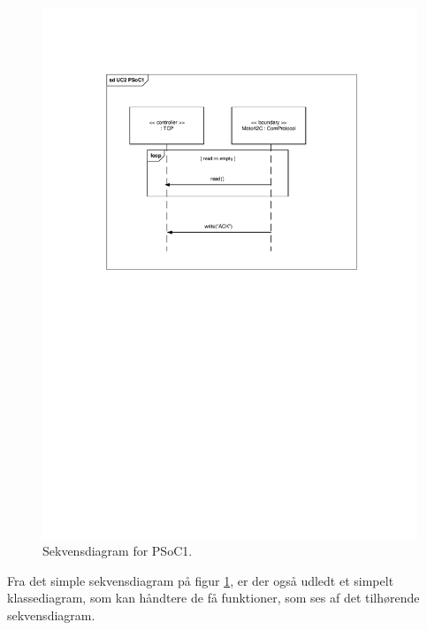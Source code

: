 \begin{figure}[H]
	\centering
	\includegraphics[trim = {3.4cm 15cm 3.2cm 3.7cm}, clip = true, width=\textwidth] {Systemarkitektur/images/SekvensdiagramPSoC1.pdf}
	\caption{Sekvensdiagram for PSoC1.}
	\label{fig:sekvensPSoC1}
\end{figure}

Fra det simple sekvensdiagram på figur \ref{fig:sekvensPSoC1}, er der også udledt et simpelt klassediagram, som kan håndtere de få funktioner, som ses af det tilhørende sekvensdiagram. 

